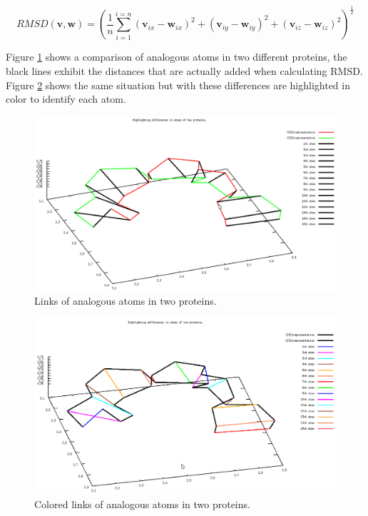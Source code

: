 \documentclass[a4paper,12pt,english]{report}
\begin{document}
$$RMSD(\mathbf{v},\mathbf{w}) = \left(\frac{1}{n}\sum_{i=1}^{i=n} (\mathbf{v}_{ix} - \mathbf{w}_{ix})^{2} + (\mathbf{v}_{iy} - \mathbf{w}_{iy})^{2} + (\mathbf{v}_{iz} - \mathbf{w}_{iz})^{2}\right)^{\frac{1}{2}}$$

Figure \ref{differences} shows a comparison of analogous atoms in two different proteins, the black lines exhibit the distances that are actually added when calculating RMSD. Figure \ref{differences2} shows the same situation but with these differences are highlighted in color to identify each atom.

\begin{figure}[!ht]
\begin{center}
\includegraphics [bb= 0 0 382 220]{images/diff.png}
\end{center}
\caption{Links of analogous atoms in two proteins.}
\label{differences}
\end{figure}

\begin{figure}[!ht]
\begin{center}
\includegraphics [bb= 0 0 382 220]{images/diff2.png}
\end{center}
\caption{Colored links of analogous atoms in two proteins.}
\label{differences2}
\end{figure}
\end{document}
